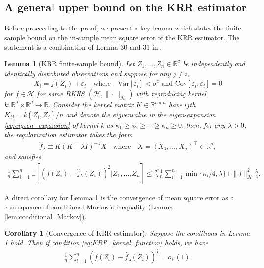 \documentclass[12pt]{article}
\newtheorem{corollary}{Corollary}
\newtheorem{lemma}{Lemma}
\theoremstyle{definition}
\def\P{\mathbb{P}}
\def\P{\mathbb{P}}
\newcommand{\E}{\mathbb E}								%
\renewcommand{\P}{\mathbb{P}}							%
\newcommand{\srz}{Z}									%
\begin{document}
\subsection{A general upper bound on the KRR estimator}

Before proceeding to the proof, we present a key lemma which states the finite-sample bound on the in-sample mean square error of the KRR estimator. The statement is a combination of Lemma 30 and 31 in \citet{Shah2018}.
\begin{lemma}[KRR finite-sample bound]\label{lem:KRR_mse}
  Let $\srz_{1},\ldots,\srz_{n}\in\mathbb{R}^d$ be independently and identically distributed observations and suppose for any $j\neq i$,
  \begin{align*}
    X_{i}=f(\srz_{i})+\varepsilon_{i}\quad\text{where}\quad \mathrm{Var}[\varepsilon_{i}]<\sigma^2\text{ and }\mathrm{Cov}[\varepsilon_{i},\varepsilon_{i}]=0
  \end{align*}
  for $f\in\mathcal{H}$ for some RKHS $(\mathcal{H},\|\cdot\|_{\mathcal{H}})$ with reproducing kernel $k:\mathbb{R}^d\times\mathbb{R}^d\rightarrow\mathbb{R}$. Consider the kernel matrix $K\in\mathbb{R}^{n\times n}$ have $ij$th $K_{ij}=k(\srz_{i},\srz_{j})/n$ and denote the eigvenvalue in the eigen-expansion \eqref{eq:eigven_expansion} of kernel $k$ as $\kappa_{1}\geq \kappa_2\geq\cdots\geq \kappa_n\geq 0$, then, for any $\lambda>0$, the regularization estimator takes the form
  \begin{align*}
    \widehat f_{\lambda}\equiv K(K+\lambda I)^{-1}X\quad\text{where}\quad X=(X_1,\ldots,X_n)^\top\in\mathbb{R}^n,
  \end{align*}
  and satisfies
  \begin{align*}
    \frac{1}{n}\sum_{i=1}^n \E[(f(\srz_i)-\widehat{f}_{\lambda}(\srz_i))^2|\srz_1,\ldots,\srz_n]\leq \frac{\sigma^2}{\lambda}\frac{1}{n}\sum_{i=1}^n\min\{\kappa_i/4,\lambda\}+\|f\|_{\mathcal{H}}^2\frac{\lambda}{4}.
  \end{align*}
\end{lemma}
\noindent A direct corollary for Lemma \ref{lem:KRR_mse} is the convergence of mean square error as a consequence of conditional Markov's inequality (Lemma \ref{lem:conditional_Markov}).
\begin{corollary}[Convergence of KRR estimator]\label{cor:KRR_consistency}
  Suppose the conditions in Lemma \ref{lem:KRR_mse} hold. Then if condition \eqref{eq:KRR_kernel_function} holds, we have 
  \begin{align*}
    \frac{1}{n}\sum_{i=1}^n (f(\srz_i)-\widehat{f}_{\lambda}(\srz_i))^2=o_\P(1).
  \end{align*}
\end{corollary}
\end{document}
